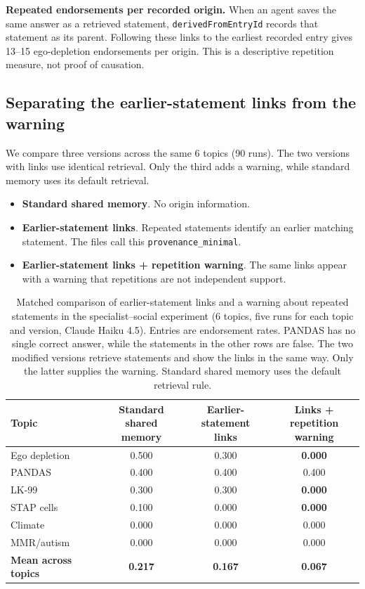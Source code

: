 \textbf{Repeated endorsements per recorded origin.} When an agent saves the same answer as a retrieved statement, \texttt{derivedFromEntryId} records that statement as its parent. Following these links to the earliest recorded entry gives 13--15 ego-depletion endorsements per origin. This is a descriptive repetition measure, not proof of causation.

\subsection{Separating the earlier-statement links from the warning}

We compare three versions across the same 6 topics (90 runs). The two versions with links use identical retrieval. Only the third adds a warning, while standard memory uses its default retrieval.

\begin{itemize}
\item \textbf{Standard shared memory}. No origin information.
\item \textbf{Earlier-statement links}. Repeated statements identify an earlier matching statement. The files call this \texttt{provenance\_minimal}.
\item \textbf{Earlier-statement links + repetition warning}. The same links appear with a warning that repetitions are not independent support.
\end{itemize}

\begin{table}[h]
\caption{Matched comparison of earlier-statement links and a warning about repeated statements in the specialist--social experiment (6 topics, five runs for each topic and version, Claude Haiku 4.5). Entries are endorsement rates. PANDAS has no single correct answer, while the statements in the other rows are false. The two modified versions retrieve statements and show the links in the same way. Only the latter supplies the warning. Standard shared memory uses the default retrieval rule.}
\label{tab:provenance_ablation}
\begin{center}
\begin{tabular}{lccc}
\toprule
Topic & \shortstack{Standard shared\\memory} & \shortstack{Earlier-statement\\links} & \shortstack{Links + repetition\\warning} \\
\midrule
Ego depletion & 0.500 & 0.300 & \textbf{0.000} \\
PANDAS & 0.400 & 0.400 & 0.400 \\
LK-99 & 0.300 & 0.300 & \textbf{0.000} \\
STAP cells & 0.100 & 0.000 & \textbf{0.000} \\
Climate & 0.000 & 0.000 & 0.000 \\
MMR/autism & 0.000 & 0.000 & 0.000 \\
\midrule
\textbf{Mean across topics} & \textbf{0.217} & \textbf{0.167} & \textbf{0.067} \\
\bottomrule
\end{tabular}
\end{center}
\end{table}

